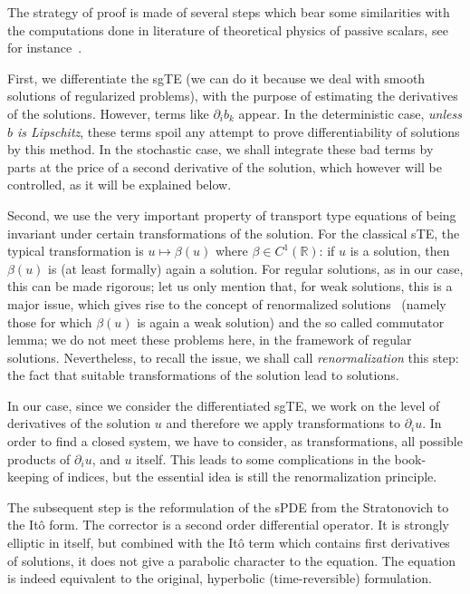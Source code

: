 \documentclass[a4paper,10pt]{article}
\begin{document}
The strategy of proof is made of several steps which bear some similarities with the computations done in literature of theoretical
physics of passive scalars, see for instance~\cite{GaKuVe}.

First, we differentiate the sgTE (we can do it because we deal with smooth
solutions of regularized problems), with the purpose of estimating the
derivatives of the solutions. However, terms like $\partial_{i}b_{k}$ 
appear. In the deterministic case, \emph{unless $b$ is Lipschitz}, these terms spoil
any attempt to prove differentiability of solutions by this method. In the
stochastic case, we shall integrate these bad terms by parts at the price of a
second derivative of the solution, which however will be controlled, as it will be 
explained below.

Second, we use the very important property of transport type equations of
being invariant under certain transformations of the solution. For the classical
sTE, the typical transformation is $u \mapsto \beta(u)$ where
$\beta\in C^{1}(\mathbb{R})$: if $u$ is a solution, then
$\beta(u)$ is (at least formally) again a solution. For
regular solutions, as in our case, this can be made rigorous; let us only
mention that, for weak solutions, this is a major issue, which gives rise to the
concept of renormalized solutions~\cite{DIPELI89} (namely those for which $\beta(
u)$ is again a weak solution) and the so called commutator lemma; we
do not meet these problems here, in the framework of regular solutions.
Nevertheless, to recall the issue, we shall call \textit{renormalization} this
step: the fact that suitable transformations of the solution lead to solutions.

In our case, since we consider the differentiated sgTE, we work on the level of derivatives of the solution $u$ and therefore we apply transformations to $\partial_{i}u$. In order to find a closed system, we have to consider, as transformations, all possible products of $\partial_{i}u$, and $u$ itself. This leads to some complications in the book-keeping of indices, but the essential idea is still the renormalization principle.

The subsequent step is the reformulation of the sPDE from the Stratonovich to
the It\^{o} form. The corrector is a second order differential operator. It is
strongly elliptic in itself, but combined with the It\^{o} term which contains
first derivatives of solutions, it does not give a parabolic character to the
equation. The equation is indeed equivalent to the original, hyperbolic
(time-reversible) formulation.
\end{document}
